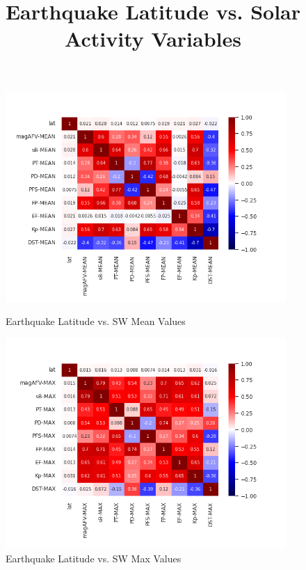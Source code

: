 \documentclass[12pt]{article}
\begin{document}
\begin{figure}
\begin{large}
\title{Earthquake Latitude vs. Solar Activity Variables}
\end{large}
\centering
  \includegraphics[width=0.95\textwidth]{corr-lat-MEAN.png}
  \caption{Earthquake Latitude vs. SW Mean Values}

  \includegraphics[width=0.95\textwidth]{corr-lat-MAX.png}
  \caption{Earthquake Latitude vs. SW Max Values}
\end{figure}

\newpage
\end{document}
